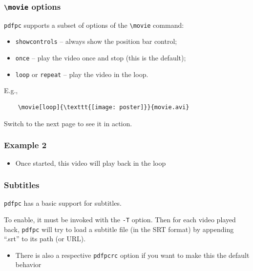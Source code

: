 \documentclass{beamer}
\newcommand{\singleitem}[1]{\begin{itemize}\item #1\end{itemize}}
\newcommand{\pdfpc}{\texttt{pdfpc}\xspace}
\newcommand{\opt}[1]{\texttt{#1}\xspace}
\begin{document}
\begin{frame}[fragile]
  \frametitle{\opt{\textbackslash movie} options}
  
  \pdfpc supports a subset of options of the \opt{\textbackslash movie} command:

  \begin{itemize}
    \item \opt{showcontrols} -- always show the position bar control;
    \item \opt{once} -- play the video once and stop (this is the default);
    \item \opt{loop} or \opt{repeat} -- play the video in the loop.
  \end{itemize}
    
  \vspace{20pt}

  E.g., 
  \begin{lstlisting}
    \movie[loop]{\texttt{[image: poster]}}{movie.avi}
  \end{lstlisting}

  \vspace{10pt}
  Switch to the next page to see it in action.
\end{frame}

\begin{frame}
  \frametitle{Example 2}

  \vspace{10pt}
  \begin{center}
  \end{center}

  \singleitem{Once started, this video will play back in the loop}

\end{frame}

\begin{frame}
  \frametitle{Subtitles}

  \pdfpc has a basic support for subtitles. 
  
  \vspace{10pt}

  To enable, it must be invoked with the \opt{-T} option. Then for each video
  played back, \pdfpc will try to load a subtitle file (in the SRT format) by
  appending ``.srt'' to its path (or URL).
  
  \singleitem{There is also a respective \opt{pdfpcrc} option if you want to
    make this the default behavior}
\end{frame}
\end{document}

